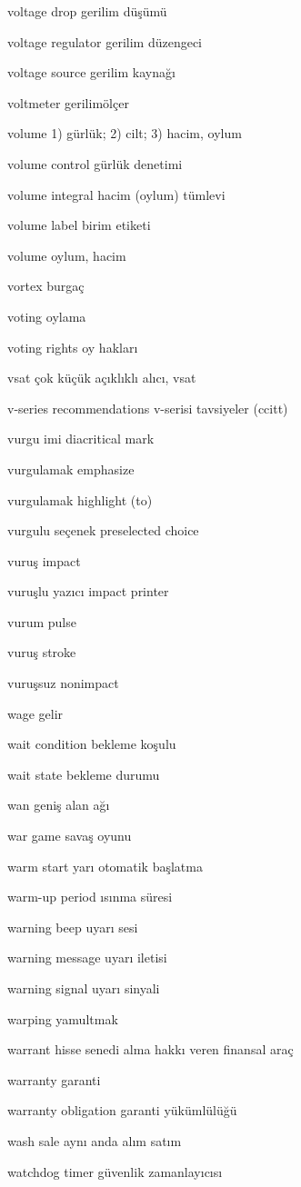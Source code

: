 \documentclass[12pt,fleqn]{article}\usepackage{../../common}
\begin{document}
voltage drop gerilim düşümü

voltage regulator gerilim düzengeci

voltage source gerilim kaynağı

voltmeter gerilimölçer

volume 1) gürlük; 2) cilt; 3) hacim, oylum

volume control gürlük denetimi

volume integral hacim (oylum) tümlevi

volume label birim etiketi

volume oylum, hacim

vortex burgaç

voting oylama

voting rights oy hakları

vsat çok küçük açıklıklı alıcı, vsat

v-series recommendations v-serisi tavsiyeler (ccitt)

vurgu imi diacritical mark

vurgulamak emphasize

vurgulamak highlight (to)

vurgulu seçenek preselected choice

vuruş impact

vuruşlu yazıcı impact printer

vurum pulse

vuruş stroke

vuruşsuz nonimpact

wage gelir

wait condition bekleme koşulu

wait state bekleme durumu

wan geniş alan ağı

war game savaş oyunu

warm start yarı otomatik başlatma

warm-up period ısınma süresi

warning beep uyarı sesi

warning message uyarı iletisi

warning signal uyarı sinyali

warping yamultmak

warrant hisse senedi alma hakkı veren finansal araç

warranty garanti

warranty obligation garanti yükümlülüğü

wash sale aynı anda alım satım

watchdog timer güvenlik zamanlayıcısı
\end{document}
